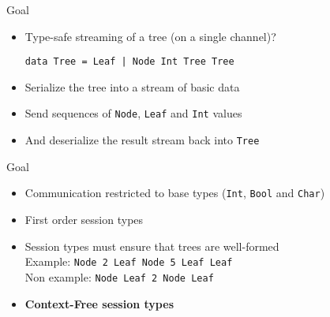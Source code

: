 \documentclass[unknownkeysallowed]{beamer}
\begin{document}
\begin{frame}[fragile]{Goal}
  \begin{itemize}
  \item Type-safe streaming of a tree (on a single channel)?
  \newline
    \begin{center}
      \lstinline"data Tree = Leaf | Node Int Tree Tree"
    \end{center}
  \vspace{0.5cm}
  \item Serialize the tree into a stream of basic data
    \newline
  \item Send sequences of \lstinline|Node|, \lstinline|Leaf| and \lstinline|Int| values
    \newline
  \item And deserialize the result stream back into \lstinline|Tree|  
  \end{itemize}
\end{frame}

\begin{frame}[fragile]{Goal}
  \begin{itemize}
    \item Communication restricted to base types (\lstinline|Int|, \lstinline|Bool| and \lstinline|Char|)
    \newline
  \item First order session types
    \newline
  \item Session types must ensure that trees are well-formed\\
    \vspace{0.3cm}
    Example: \lstinline|Node 2 Leaf Node 5 Leaf Leaf|\\
    Non example: \lstinline|Node Leaf 2 Node Leaf|
    \newline
  \item \textbf{Context-Free session types}
  \end{itemize}
\end{frame}
\end{document}
